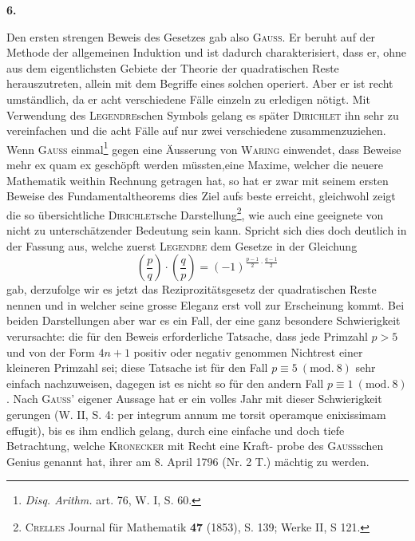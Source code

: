 \clearpage{}
\begin{center}\bfseries 6.\end{center}
\noindent\hspace*{\parindent}Den ersten strengen Beweis des Gesetzes gab also \textsc{Gauss}. Er beruht auf der Methode der allgemeinen Induktion und ist dadurch charakterisiert, dass er, ohne aus dem eigentlichsten Gebiete der Theorie der quadratischen Reste herauszutreten, allein mit dem Begriffe eines solchen operiert. Aber er ist recht umständlich, da er acht verschiedene Fälle einzeln zu erledigen nötigt. Mit Verwendung des \textsc{Legendre}schen Symbols gelang es später \textsc{Dirichlet} ihn sehr zu vereinfachen und die acht Fälle auf nur zwei verschiedene zusammenzuziehen. Wenn \textsc{Gauss} einmal\footnote{\textit{Disq. Arithm.} art. 76, W. I, S. 60.} gegen eine Äusserung von \textsc{Waring} einwendet, dass Beweise mehr ex  quam ex  geschöpft werden müssten,\linebreak eine Maxime, welcher die neuere Mathematik weithin Rechnung getragen hat, so hat er zwar mit seinem ersten Beweise des Fundamentaltheorems dies Ziel aufs beste erreicht, gleichwohl zeigt die so übersichtliche \textsc{Dirichlet}sche Darstellung\begingroup\renewcommand{\thefootnote}{**)}\footnote{\textsc{Crelles} Journal für Mathematik \textbf{47} (1853), S. 139; Werke II, S 121.}\endgroup, wie auch eine geeignete  von nicht zu unterschätzender Bedeutung sein kann. Spricht sich dies doch deutlich in der Fassung aus, welche zuerst \textsc{Legendre} dem Gesetze in der Gleichung
\[
\left(\frac{p}{q}\right)\cdot\left(\frac{q}{p}\right)=(-1)^{\frac{p-1}{2}\cdot\frac{q-1}{2}}
\]
gab, derzufolge wir es jetzt das Reziprozitätsgesetz der quadratischen Reste nennen und in welcher seine grosse Eleganz erst voll zur Erscheinung kommt. Bei beiden Darstellungen aber war es ein Fall, der eine ganz besondere Schwierigkeit verursachte: die für den Beweis erforderliche Tatsache, dass jede Primzahl \(p>5\) und von der Form \(4n+1\) positiv oder negativ genommen Nichtrest einer kleineren Primzahl sei; diese Tatsache ist für den Fall \(p\equiv5\ (\mathrm{mod.}\ 8)\) sehr einfach nachzuweisen, dagegen ist es nicht so für den andern Fall \(p\equiv1\ (\mathrm{mod.}\ 8)\). Nach \textsc{Gauss}’ eigener Aussage hat er ein volles Jahr mit dieser Schwierigkeit gerungen (W. II, S. 4: per integrum annum me torsit operamque enixissimam effugit), bis es ihm endlich gelang, durch eine einfache und doch tiefe Betrachtung, welche \textsc{Kronecker} mit Recht eine Kraft-\newpage
{}
\noindent probe des \textsc{Gauss}schen Genius genannt hat, ihrer am 8. April 1796 (Nr. 2 T.) mächtig zu werden.

